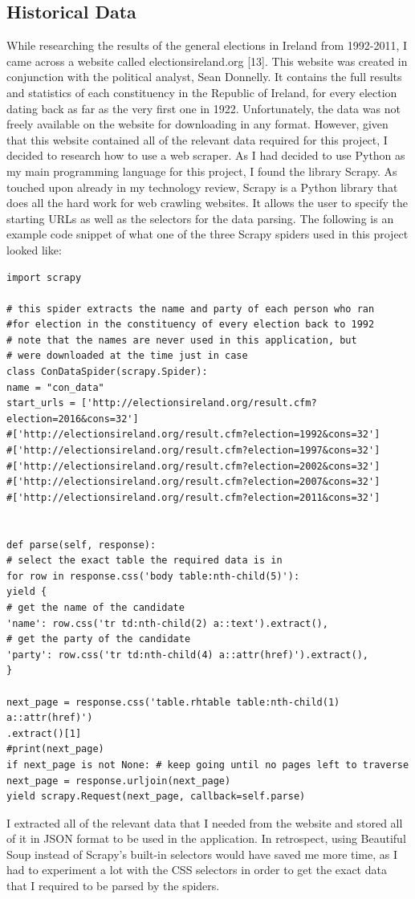 \subsection{Historical Data}
While researching the results of the general elections in Ireland from 1992-2011, I came across a website called electionsireland.org [13]. This website was created in conjunction with the political analyst, Sean Donnelly. It contains the full results and statistics of each constituency in the Republic of Ireland, for every election dating back as far as the very first one in 1922. Unfortunately, the data was not freely available on the website for downloading in any format. However, given that this website contained all of the relevant data required for this project, I decided to research how to use a web scraper. As I had decided to use Python as my main programming language for this project, I found the library Scrapy. As touched upon already in my technology review, Scrapy is a Python library that does all the hard work for web crawling websites. It allows the user to specify the starting URLs as well as the selectors for the data parsing. The following is an example code snippet of what one of the three Scrapy spiders used in this project looked like:
\begin{verbatim}
import scrapy

# this spider extracts the name and party of each person who ran 
#for election in the constituency of every election back to 1992
# note that the names are never used in this application, but 
# were downloaded at the time just in case
class ConDataSpider(scrapy.Spider):
name = "con_data"
start_urls = ['http://electionsireland.org/result.cfm?election=2016&cons=32']
#['http://electionsireland.org/result.cfm?election=1992&cons=32']
#['http://electionsireland.org/result.cfm?election=1997&cons=32']
#['http://electionsireland.org/result.cfm?election=2002&cons=32']
#['http://electionsireland.org/result.cfm?election=2007&cons=32']
#['http://electionsireland.org/result.cfm?election=2011&cons=32']


def parse(self, response):
# select the exact table the required data is in
for row in response.css('body table:nth-child(5)'): 
yield {
# get the name of the candidate
'name': row.css('tr td:nth-child(2) a::text').extract(), 
# get the party of the candidate
'party': row.css('tr td:nth-child(4) a::attr(href)').extract(), 
}

next_page = response.css('table.rhtable table:nth-child(1) a::attr(href)')
.extract()[1]
#print(next_page)
if next_page is not None: # keep going until no pages left to traverse
next_page = response.urljoin(next_page)
yield scrapy.Request(next_page, callback=self.parse)
\end{verbatim}
I extracted all of the relevant data that I needed from the website and stored all of it in JSON format to be used in the application. In retrospect,  using Beautiful Soup instead of Scrapy’s built-in selectors would have saved me more time, as I had to experiment a lot with the CSS selectors in order to get the exact data that I required to be parsed by the spiders. 
